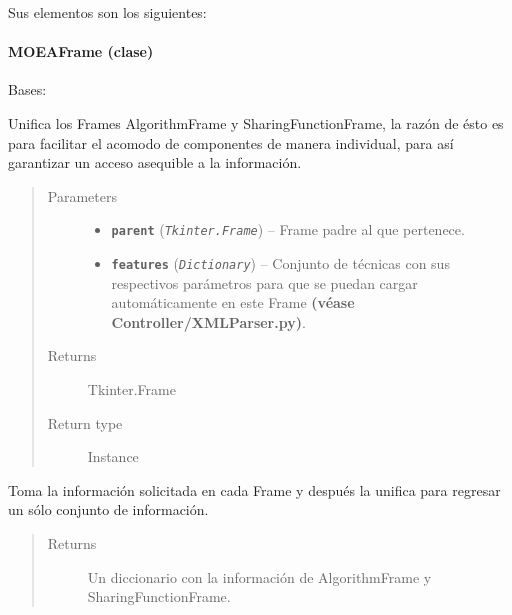 \documentclass[letterpaper,10pt,english]{sphinxmanual}
\begin{document}
Sus elementos son los siguientes:


\paragraph{MOEAFrame (clase)}
\label{View/Main/MOEA/MOEAFrame:module-View.Main.MOEA.MOEAFrame}\label{View/Main/MOEA/MOEAFrame::doc}\label{View/Main/MOEA/MOEAFrame:moeaframe-clase}

\begin{fulllineitems}
\label{View/Main/MOEA/MOEAFrame:View.Main.MOEA.MOEAFrame.MOEAFrame}
Bases: 

Unifica los Frames AlgorithmFrame y SharingFunctionFrame, 
la razón de ésto es para facilitar el acomodo de componentes de manera 
individual, para así garantizar un acceso asequible a la información.
\begin{quote}\begin{description}
\item[{Parameters}] \leavevmode\begin{itemize}
\item {} 
\textbf{\texttt{parent}} (\emph{\texttt{Tkinter.Frame}}) -- Frame padre al que pertenece.

\item {} 
\textbf{\texttt{features}} (\emph{\texttt{Dictionary}}) -- Conjunto de técnicas con sus respectivos parámetros para que
se puedan cargar automáticamente en este Frame \textbf{(véase
Controller/XMLParser.py)}.

\end{itemize}

\item[{Returns}] \leavevmode
Tkinter.Frame

\item[{Return type}] \leavevmode
Instance

\end{description}\end{quote}

\begin{fulllineitems}
\label{View/Main/MOEA/MOEAFrame:View.Main.MOEA.MOEAFrame.MOEAFrame.get_information}
Toma la información solicitada en cada Frame y después
la unifica para regresar un sólo conjunto de información.
\begin{quote}\begin{description}
\item[{Returns}] \leavevmode
Un diccionario con la información de AlgorithmFrame y SharingFunctionFrame.


\end{description}
\end{quote}
\end{fulllineitems}
\end{fulllineitems}
\end{document}
